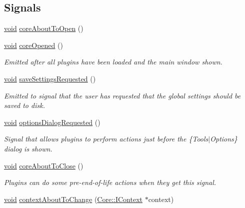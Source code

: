\subsection*{\-Signals}
\begin{DoxyCompactItemize}
\item 
\hyperlink{group___u_a_v_objects_plugin_ga444cf2ff3f0ecbe028adce838d373f5c}{void} \hyperlink{group___core_plugin_ga10069a0bda308595dfad2aabf5d4a711}{core\-About\-To\-Open} ()
\item 
\hyperlink{group___u_a_v_objects_plugin_ga444cf2ff3f0ecbe028adce838d373f5c}{void} \hyperlink{group___core_plugin_ga1b43a0185eb3abefdae4d893e653843d}{core\-Opened} ()
\begin{DoxyCompactList}\small\item\em \-Emitted after all plugins have been loaded and the main window shown. \end{DoxyCompactList}\item 
\hyperlink{group___u_a_v_objects_plugin_ga444cf2ff3f0ecbe028adce838d373f5c}{void} \hyperlink{group___core_plugin_ga5deecf671e1390e1489d696dd89f112d}{save\-Settings\-Requested} ()
\begin{DoxyCompactList}\small\item\em \-Emitted to signal that the user has requested that the global settings should be saved to disk. \end{DoxyCompactList}\item 
\hyperlink{group___u_a_v_objects_plugin_ga444cf2ff3f0ecbe028adce838d373f5c}{void} \hyperlink{group___core_plugin_gafba7e27b9e0330206e2c77eebbeb7038}{options\-Dialog\-Requested} ()
\begin{DoxyCompactList}\small\item\em \-Signal that allows plugins to perform actions just before the \{\-Tools$|$\-Options\} dialog is shown. \end{DoxyCompactList}\item 
\hyperlink{group___u_a_v_objects_plugin_ga444cf2ff3f0ecbe028adce838d373f5c}{void} \hyperlink{group___core_plugin_ga36e71fe35d26feb63b78a56f08159f17}{core\-About\-To\-Close} ()
\begin{DoxyCompactList}\small\item\em \-Plugins can do some pre-\/end-\/of-\/life actions when they get this signal. \end{DoxyCompactList}\item 
\hyperlink{group___u_a_v_objects_plugin_ga444cf2ff3f0ecbe028adce838d373f5c}{void} \hyperlink{group___core_plugin_ga682fdb2c297d6f8d9b7340dbb58699ec}{context\-About\-To\-Change} (\hyperlink{class_core_1_1_i_context}{\-Core\-::\-I\-Context} $\ast$context)

\end{DoxyCompactItemize}
